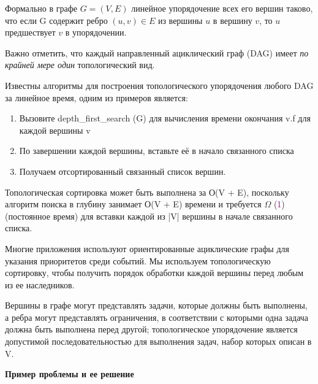 Формально в графе $G = (V, E)$ линейное упорядочение всех его вершин
таково, что если G содержит ребро $(u, v) \in E$ из вершины $u$ в вершину $v$, то $u$ предшествует $v$ в упорядочении.

\vspace{\baselineskip}

Важно отметить, что каждый направленный ациклический граф (DAG) имеет \textit{по крайней мере один} топологический вид.

\vspace{\baselineskip}

Известны алгоритмы для построения топологического упорядочения любого DAG за линейное время, одним из примеров является:

\begin{enumerate}
    \item Вызовите { depth\_first\_search (G)} для вычисления времени окончания { v.f} для каждой вершины { v}
    \item По завершении каждой вершины, вставьте её в начало связанного списка
    \item Получаем отсортированный связанный список вершин.
\end{enumerate}

Топологическая сортировка может быть выполнена за О(V + E), поскольку алгоритм поиска в глубину занимает О(V + E) времени и требуется $\Omega$ (\textcolor{Purple}{1}) (постоянное время) для вставки каждой из |V| вершины в начале связанного списка.

\vspace{\baselineskip}

Многие приложения используют ориентированные ациклические графы для указания приоритетов среди событий. Мы используем топологическую сортировку, чтобы получить порядок обработки каждой вершины перед любым из ее наследников.

\vspace{\baselineskip}

Вершины в графе могут представлять задачи, которые должны быть выполнены, а ребра могут представлять ограничения, в соответствии с которыми одна задача должна быть выполнена перед другой; топологическое упорядочение является допустимой последовательностью для выполнения задач, набор которых описан в V.

\vspace{\baselineskip}

\textbf{Пример проблемы и ее решение}


